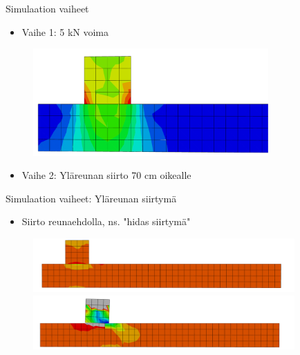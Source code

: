 \documentclass{beamer}
\begin{document}
\begin{frame}{Simulaation vaiheet}

\begin{itemize}
\item Vaihe 1: 5 kN voima
\end{itemize}

\begin{figure}
\includegraphics[width=9cm]{mises.pdf}
\end{figure}

\begin{itemize}
\item Vaihe 2: Yläreunan siirto 70 cm oikealle
\end{itemize}

\end{frame}

\begin{frame}{Simulaation vaiheet: Yläreunan siirtymä}

\begin{itemize}
\item Siirto reunaehdolla, ns. "hidas siirtymä"
\end{itemize}

\begin{figure}
\includegraphics[width=10cm]{anim1.pdf}\\
\includegraphics[width=10cm]{anim2.pdf}
\end{figure}

\end{frame}
\end{document}
